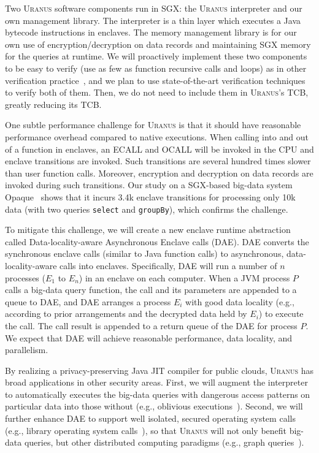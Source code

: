 \documentclass{article}
\let\vv\texttt
\newcommand{\maat}[0]{\textsc{Uranus}\xspace}
\newcommand{\chref}[1]{\S\ref{#1}}
\newcommand{\eg}{{e.g.}}
\begin{document}
Two \maat software components run in SGX: the \maat interpreter and our own
management library. The interpreter is a thin layer which executes a Java
bytecode instructions in enclaves. The memory management library is for our own
use of encryption/decryption on data records and maintaining SGX memory for the
queries at runtime. We will proactively implement these two components to be
easy to verify (use as few as function recursive calls and loops) as in other
verification practice~\cite{xi:sosp17}, and we plan to use state-of-the-art
verification techniques~\cite{xi:sosp17} to verify both of them. Then, we do not
need to include them in \maat's TCB, greatly reducing its TCB.



One subtle performance challenge for \maat is that it should have reasonable 
performance overhead compared to native executions. When calling into and 
out of a function in enclaves, an ECALL and OCALL will be invoked in the CPU 
and enclave transitions are invoked. Such transitions are several hundred 
times slower than user function calls. Moreover, encryption and decryption on 
data records are invoked during such transitions. Our study on a SGX-based 
big-data system Opaque~\cite{opaque:nsdi17} shows that it incurs 3.4k enclave
transitions for processing only 10k data (with two queries \vv{select} and 
\vv{groupBy}), which confirms the challenge.

To mitigate this challenge, we will create a new enclave runtime abstraction 
called Data-locality-aware Asynchronous Enclave calls (DAE). DAE converts the 
synchronous enclave calls (similar to Java function calls) to asynchronous, 
data-locality-aware calls into enclaves. Specifically, DAE will run a number of 
$n$ processes ($E_{1}$ to $E_{n}$) in an enclave on each computer. When a 
JVM process $P$ calls a big-data query function, the call and its parameters 
are appended to a queue to DAE, and DAE arranges a process $E_{i}$ with good 
data locality (\eg, according to prior arrangements and the decrypted data 
held by $E_{i}$) to execute the call. The call result is appended to a return 
queue of the DAE for process $P$. We expect that DAE will achieve reasonable 
performance, data locality, and parallelism.

By realizing a privacy-preserving Java JIT compiler for public clouds, \maat has
broad applications in other security areas. First, we will augment the
interpreter to automatically executes the big-data queries with dangerous access
patterns on particular data into those without (\eg, oblivious
executions~\cite{bigmatrix:ccs17}). Second, we will further enhance DAE to
support well isolated, secured operating system calls (\eg, library operating
system calls~\cite{graphene:atc17}), so that \maat will not only benefit
big-data queries, but other distributed computing paradigms (\eg, graph
queries~\cite{sigmod10:pregel}).



 
\end{document}
